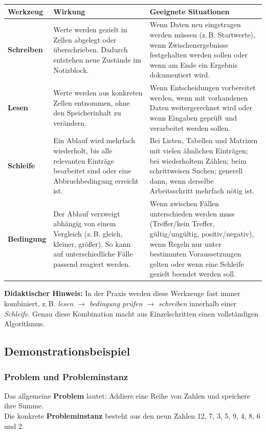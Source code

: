 \documentclass{article}
\begin{document}
    \begin{center}
    \begin{tabular}{|p{3.2cm}|p{5.8cm}|p{9.8cm}|}
    \hline
    	\textbf{Werkzeug} & \textbf{Wirkung} & \textbf{Geeignete Situationen} \\
    \hline
    	\textbf{Schreiben} &
    Werte werden gezielt in Zellen abgelegt oder überschrieben. Dadurch entstehen neue Zustände im Notizblock. &
    Wenn Daten neu eingetragen werden müssen (z.\,B. Startwerte), wenn Zwischenergebnisse festgehalten werden sollen oder wenn am Ende ein Ergebnis dokumentiert wird. \\
    \hline
    	\textbf{Lesen} &
    Werte werden aus konkreten Zellen entnommen, ohne den Speicherinhalt zu verändern. &
    Wenn Entscheidungen vorbereitet werden, wenn mit vorhandenen Daten weitergerechnet wird oder wenn Eingaben geprüft und verarbeitet werden sollen. \\
    \hline
      	\textbf{Schleife} &
    Ein Ablauf wird mehrfach wiederholt, bis alle relevanten Einträge bearbeitet sind oder eine Abbruchbedingung erreicht ist. &
    Bei Listen, Tabellen und Matrizen mit vielen ähnlichen Einträgen; bei wiederholtem Zählen; beim schrittweisen Suchen; generell dann, wenn derselbe Arbeitsschritt mehrfach nötig ist. \\
    \hline
    	\textbf{Bedingung} &
    Der Ablauf verzweigt abhängig von einem Vergleich (z.\,B. gleich, kleiner, größer). So kann auf unterschiedliche Fälle passend reagiert werden. &
    Wenn zwischen Fällen unterschieden werden muss (Treffer/kein Treffer, gültig/ungültig, positiv/negativ), wenn Regeln nur unter bestimmten Voraussetzungen gelten oder wenn eine Schleife gezielt beendet werden soll. \\
    \hline
    \end{tabular}
    \end{center}

	    	\textbf{Didaktischer Hinweis:} In der Praxis werden diese Werkzeuge fast immer kombiniert, z.\,B. \emph{lesen $\rightarrow$ bedingung prüfen $\rightarrow$ schreiben} innerhalb einer \emph{Schleife}. Genau diese Kombination macht aus Einzelschritten einen vollständigen Algorithmus.


    \subsection{Demonstrationsbeispiel}

    \subsubsection{Problem und Probleminstanz}
    Das allgemeine \textbf{Problem} lautet: Addiere eine Reihe von Zahlen und speichere ihre Summe.\\
    Die konkrete \textbf{Probleminstanz} besteht aus den neun Zahlen 12, 7, 3, 5, 9, 4, 8, 6 und 2.
\end{document}
